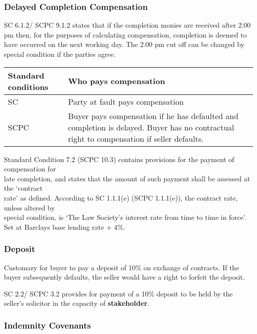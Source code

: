 \documentclass[
]{article}
\begin{document}
\hypertarget{delayed-completion-compensation}{%
\subsubsection{Delayed Completion
Compensation}\label{delayed-completion-compensation}}

SC 6.1.2/ SCPC 9.1.2 states that if the completion monies are received
after 2.00 pm then, for the purposes of calculating compensation,
completion is deemed to have occurred on the next working day. The 2.00
pm cut off can be changed by special condition if the parties agree.

\begin{longtable}[]{@{}ll@{}}
\toprule()
Standard conditions & Who pays compensation \\
\midrule()
\endhead
SC & Party at fault pays compensation \\
SCPC & Buyer pays compensation if he has defaulted and completion is
delayed. Buyer has no contractual right to compensation if seller
defaults. \\
\bottomrule()
\end{longtable}

Standard Condition 7.2 (SCPC 10.3) contains provisions for the payment
of compensation for\\
late completion, and states that the amount of such payment shall be
assessed at the `contract\\
rate' as defined. According to SC 1.1.1(e) (SCPC 1.1.1(e)), the contract
rate, unless altered by\\
special condition, is `The Law Society's interest rate from time to time
in force'. Set at Barclays base lending rate + 4\%.

\hypertarget{deposit}{%
\subsubsection{Deposit}\label{deposit}}

Customary for buyer to pay a deposit of 10\% on exchange of contracts.
If the buyer subsequently defaults, the seller would have a right to
forfeit the deposit.

SC 2.2/ SCPC 3.2 provides for payment of a 10\% deposit to be held by
the seller's solicitor in the capacity of \textbf{stakeholder}.

\hypertarget{indemnity-covenants}{%
\subsubsection{Indemnity Covenants}\label{indemnity-covenants}}
\end{document}
